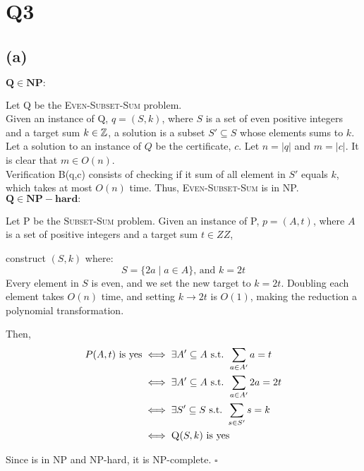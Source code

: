 \section*{Q3}

\subsection*{(a)}

$\mathbf{Q \in NP:}$

Let Q be the \textsc{Even-Subset-Sum} problem.\\
Given an instance of Q, $q = (S, k)$, 
where \( S \) is a set of even positive integers and a target sum \( k \in \mathbb{Z} \), 
a solution is a subset \( S' \subseteq S \) whose elements sums to $k$.\\
Let a solution to an instance of $Q$ be the certificate, $c$. 
Let $n = |q|$ and $m = |c|$. It is clear that $m \in O(n)$.\\

Verification B(q,c) consists of checking if it sum of all element in $S'$ equals \( k \), which takes at most \( O(n) \) time. Thus, \textsc{Even-Subset-Sum} is in NP.\\

$\mathbf{Q \in NP-hard:}$

Let P be the \textsc{Subset-Sum} problem.
Given an instance of P, $p = (A, t)$, 
where \( A \) is a set of positive integers and a target sum \( t \in ZZ\), 

construct \( (S, k) \) where:
\[
S = \{ 2a \mid a \in A \} \text{, and } k = 2t \]
Every element in \( S \) is even, and we set the new target to \( k = 2t \).
Doubling each element takes \( O(n) \) time, and setting \( k \to 2t \) is \( O(1) \), making the reduction a polynomial transformation.

Then, 
\begin{equation}
    \begin{split}
        P(A, t) \text{ is yes} &\iff \exists A' \subseteq A \text{ s.t. } \sum_{a \in A'} a = t \\
        &\iff \exists A' \subseteq A \text{ s.t. } \sum_{a \in A'} 2a = 2t \\
        &\iff \exists S' \subseteq S \text{ s.t. } \sum_{s \in S'} s = k \\
        &\iff \textsc{Q}(S, k) \text{ is yes}
    \end{split}
\end{equation}

Since  is in NP and NP-hard, it is NP-complete. \(\square\)

